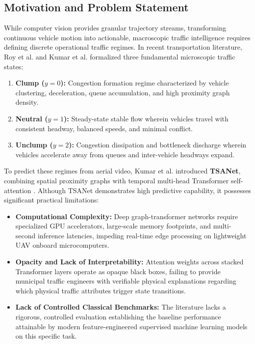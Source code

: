 \documentclass[conference]{IEEEtran}
\begin{document}
\subsection{Motivation and Problem Statement}
While computer vision provides granular trajectory streams, transforming continuous vehicle motion into actionable, macroscopic traffic intelligence requires defining discrete operational traffic regimes. In recent transportation literature, Roy et al. \cite{roy2020defining} and Kumar et al. \cite{kumar2024tsanet} formalized three fundamental microscopic traffic states:
\begin{enumerate}
    \item \textbf{Clump ($y=0$):} Congestion formation regime characterized by vehicle clustering, deceleration, queue accumulation, and high proximity graph density.
    \item \textbf{Neutral ($y=1$):} Steady-state stable flow wherein vehicles travel with consistent headway, balanced speeds, and minimal conflict.
    \item \textbf{Unclump ($y=2$):} Congestion dissipation and bottleneck discharge wherein vehicles accelerate away from queues and inter-vehicle headways expand.
\end{enumerate}

To predict these regimes from aerial video, Kumar et al. \cite{kumar2024tsanet} introduced \textbf{TSANet}, combining spatial proximity graphs with temporal multi-head Transformer self-attention \cite{vaswani2017attention}. Although TSANet demonstrates high predictive capability, it possesses significant practical limitations:
\begin{itemize}
    \item \textbf{Computational Complexity:} Deep graph-transformer networks require specialized GPU accelerators, large-scale memory footprints, and multi-second inference latencies, impeding real-time edge processing on lightweight UAV onboard microcomputers.
    \item \textbf{Opacity and Lack of Interpretability:} Attention weights across stacked Transformer layers operate as opaque black boxes, failing to provide municipal traffic engineers with verifiable physical explanations regarding which physical traffic attributes trigger state transitions.
    \item \textbf{Lack of Controlled Classical Benchmarks:} The literature lacks a rigorous, controlled evaluation establishing the baseline performance attainable by modern feature-engineered supervised machine learning models on this specific task.
\end{itemize}
\end{document}
